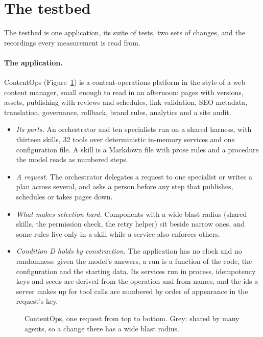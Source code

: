 \documentclass[11pt,a4paper]{article}
\begin{document}
\section{The testbed}
\label{sec:setup}

The testbed is one application, its suite of tests, two sets of changes, and the recordings every measurement is
read from.

\paragraph{The application.} ContentOps (Figure~\ref{fig:app}) is a content-operations platform in the style of a
web content manager, small enough to read in an afternoon: pages with versions, assets, publishing with reviews and
schedules, link validation, SEO metadata, translation, governance, rollback, brand rules, analytics and a site
audit.
\begin{itemize}
  \item \emph{Its parts.} An orchestrator and ten specialists run on a shared harness, with thirteen skills, 32
        tools over deterministic in-memory services and one configuration file. A skill is a Markdown file with
        prose rules and a procedure the model reads as numbered steps.
  \item \emph{A request.} The orchestrator delegates a request to one specialist or writes a plan across several,
        and asks a person before any step that publishes, schedules or takes pages down.
  \item \emph{What makes selection hard.} Components with a wide blast radius (shared skills, the permission
        check, the retry helper) sit beside narrow ones, and some rules live only in a skill while a service also
        enforces others.
  \item \emph{Condition D holds by construction.} The application has no clock and no randomness: given the
        model's answers, a run is a function of the code, the configuration and the starting data. Its services
        run in process, idempotency keys and seeds are derived from the operation and from names, and the ids a
        server makes up for tool calls are numbered by order of appearance in the request's key.
\end{itemize}

\begin{figure}[!htbp]
  \centering
  \resizebox{0.92\textwidth}{!}{}
  \caption{ContentOps, one request from top to bottom. Grey: shared by many agents, so a change there has a wide
  blast radius.}
  \label{fig:app}
\end{figure}
\end{document}
